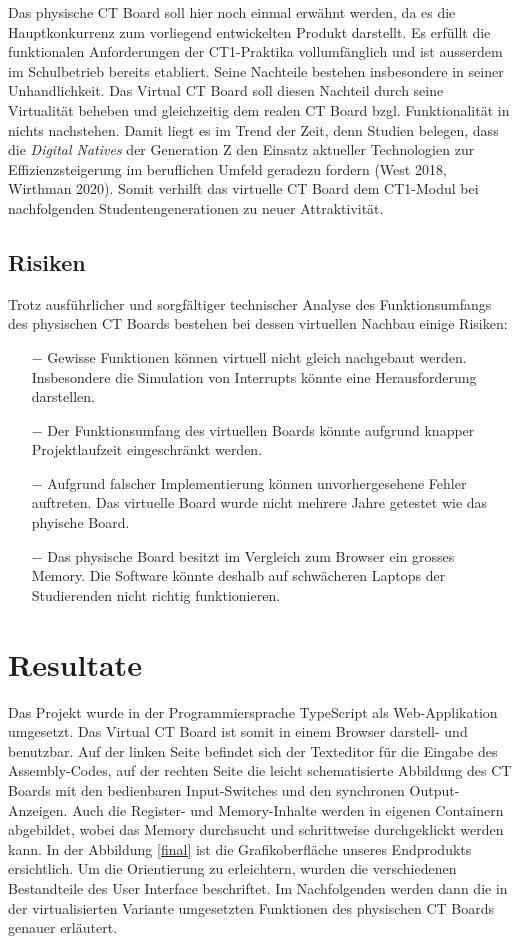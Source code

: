 \documentclass[10pt]{article}
\begin{document}
Das physische CT Board soll hier noch einmal erwähnt werden, da es die Hauptkonkurrenz zum vorliegend entwickelten Produkt darstellt. Es erfüllt die funktionalen Anforderungen der CT1-Praktika vollumfänglich und ist ausserdem im Schulbetrieb bereits etabliert. Seine Nachteile bestehen insbesondere in seiner Unhandlichkeit. Das \glqq Virtual CT Board\grqq{} soll diesen Nachteil durch seine Virtualität beheben und gleichzeitig dem realen CT Board bzgl. Funktionalität in nichts nachstehen. Damit liegt es im Trend der Zeit, denn Studien belegen, dass die \emph{Digital Natives} der Generation Z den Einsatz aktueller Technologien zur Effizienzsteigerung im beruflichen Umfeld geradezu fordern (West 2018, Wirthman 2020). Somit verhilft das virtuelle CT Board dem CT1-Modul bei nachfolgenden Studentengenerationen zu neuer Attraktivität.


\subsection{Risiken}
Trotz ausführlicher und sorgfältiger technischer Analyse des Funktionsumfangs des physischen CT Boards bestehen bei dessen virtuellen Nachbau einige Risiken:
\begin{itemize}
\item[$-$] Gewisse Funktionen können virtuell nicht gleich nachgebaut werden. Insbesondere die Simulation von Interrupts könnte eine Herausforderung darstellen.
\item[$-$] Der Funktionsumfang des virtuellen Boards könnte aufgrund knapper Projektlaufzeit eingeschränkt werden. 
\item[$-$] Aufgrund falscher Implementierung können unvorhergesehene Fehler auftreten. Das virtuelle Board wurde nicht mehrere Jahre getestet wie das phyische Board.
\item[$-$] Das physische Board besitzt im Vergleich zum Browser ein grosses Memory. Die Software könnte deshalb auf schwächeren Laptops der Studierenden nicht richtig funktionieren. 
\end{itemize}

\section{Resultate}

Das Projekt wurde in der Programmiersprache TypeScript als Web-Applikation umgesetzt. Das \glqq Virtual CT Board\grqq{} ist somit in einem Browser darstell- und benutzbar. Auf der linken Seite befindet sich der Texteditor für die Eingabe des Assembly-Codes, auf der rechten Seite die leicht schematisierte Abbildung des CT Boards mit den bedienbaren Input-Switches und den synchronen Output-Anzeigen. Auch die Register- und Memory-Inhalte werden in eigenen Containern abgebildet, wobei das Memory durchsucht und schrittweise durchgeklickt werden kann. In der Abbildung \ref{final} ist die Grafikoberfläche unseres Endprodukts ersichtlich. Um die Orientierung zu erleichtern, wurden die verschiedenen Bestandteile des User Interface beschriftet. Im Nachfolgenden werden dann die in der virtualisierten Variante umgesetzten Funktionen des physischen CT Boards genauer erläutert.
\end{document}
